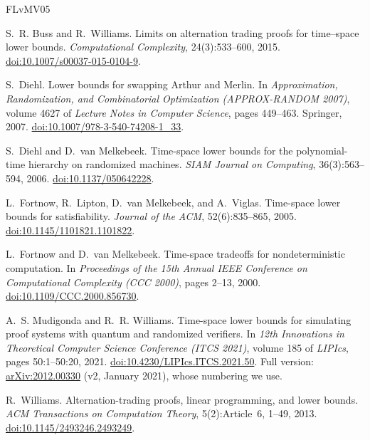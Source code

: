 \documentclass[11pt]{article}
\theoremstyle{definition}
\begin{document}
\begin{thebibliography}{FLvMV05}

S.~R. Buss and R.~Williams.
\newblock Limits on alternation trading proofs for time--space lower bounds.
\newblock \emph{Computational Complexity}, 24(3):533--600, 2015.
\newblock \href{https://doi.org/10.1007/s00037-015-0104-9}{doi:10.1007/s00037-015-0104-9}.

S.~Diehl.
\newblock Lower bounds for swapping Arthur and Merlin.
\newblock In \emph{Approximation, Randomization, and Combinatorial Optimization (APPROX-RANDOM 2007)}, volume 4627 of \emph{Lecture Notes in Computer Science}, pages 449--463. Springer, 2007.
\newblock \href{https://doi.org/10.1007/978-3-540-74208-1_33}{doi:10.1007/978-3-540-74208-1\_33}.

S.~Diehl and D.~van Melkebeek.
\newblock Time-space lower bounds for the polynomial-time hierarchy on randomized machines.
\newblock \emph{SIAM Journal on Computing}, 36(3):563--594, 2006.
\newblock \href{https://doi.org/10.1137/050642228}{doi:10.1137/050642228}.

L.~Fortnow, R.~Lipton, D.~van Melkebeek, and A.~Viglas.
\newblock Time-space lower bounds for satisfiability.
\newblock \emph{Journal of the ACM}, 52(6):835--865, 2005.
\newblock \href{https://doi.org/10.1145/1101821.1101822}{doi:10.1145/1101821.1101822}.

L.~Fortnow and D.~van Melkebeek.
\newblock Time-space tradeoffs for nondeterministic computation.
\newblock In \emph{Proceedings of the 15th Annual IEEE Conference on Computational Complexity (CCC 2000)}, pages 2--13, 2000.
\newblock \href{https://doi.org/10.1109/CCC.2000.856730}{doi:10.1109/CCC.2000.856730}.

A.~S. Mudigonda and R.~R. Williams.
\newblock Time-space lower bounds for simulating proof systems with quantum and randomized verifiers.
\newblock In \emph{12th Innovations in Theoretical Computer Science Conference (ITCS 2021)}, volume 185 of \emph{LIPIcs}, pages 50:1--50:20, 2021.
\newblock \href{https://doi.org/10.4230/LIPIcs.ITCS.2021.50}{doi:10.4230/LIPIcs.ITCS.2021.50}.
\newblock Full version: \href{https://arxiv.org/abs/2012.00330}{arXiv:2012.00330} (v2, January 2021), whose numbering we use.

R.~Williams.
\newblock Alternation-trading proofs, linear programming, and lower bounds.
\newblock \emph{ACM Transactions on Computation Theory}, 5(2):Article~6, 1--49, 2013.
\newblock \href{https://doi.org/10.1145/2493246.2493249}{doi:10.1145/2493246.2493249}.

\end{thebibliography}
\end{document}
